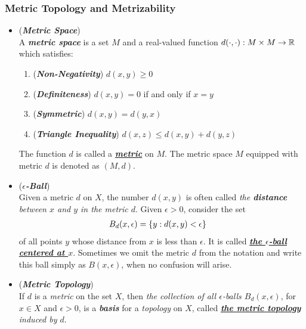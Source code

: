 \documentclass[11pt]{article}
\begin{document}
\subsubsection{Metric Topology and Metrizability}
\begin{itemize}
\item \begin{definition} (\emph{\textbf{Metric Space}})\\
A \emph{\textbf{metric space}} is a set $M$ and a real-valued function $d(\cdot , \cdot): M \times M \rightarrow {\mathbb R}$  which satisfies:
\begin{enumerate}
\item (\emph{\textbf{Non-Negativity}}) $d(x, y) \ge 0$
\item (\emph{\textbf{Definiteness}}) $d(x, y) = 0$ if and only if $x = y$
\item (\emph{\textbf{Symmetric}}) $d(x, y) = d(y, x)$
\item (\emph{\textbf{Triangle Inequality}}) $d(x, z) \le d(x, y) + d(y, z)$
\end{enumerate} The function $d$ is called a \underline{\emph{\textbf{metric}}} on $M$. The metric space $M$ equipped with metric $d$ is denoted as $(M, d)$.
\end{definition}

\item \begin{definition} (\emph{\textbf{$\epsilon$-Ball}})\\
Given a metric $d$ on $X$, the number $d(x, y)$ is often called \emph{the \textbf{distance} between $x$ and $y$ in the metric $d$}. Given $\epsilon > 0$, consider the set
\begin{align*}
B_{d}(x, \epsilon) &= \left\{y: d(x,y) < \epsilon\right\}
\end{align*}
of all points $y$ whose distance from $x$ is less than $\epsilon$. It is called \underline{\emph{\textbf{the $\epsilon$-ball centered at $x$}}}. Sometimes we omit the metric $d$ from the notation and write this ball simply as $B(x, \epsilon)$, when no confusion will arise.
\end{definition}

\item \begin{definition} (\emph{\textbf{Metric Topology}})\\
If $d$ is a \emph{metric} on the set $X$, then \emph{the collection of all $\epsilon$-balls $B_{d}(x, \epsilon)$}, for $x \in X$ and $\epsilon > 0$, is a \emph{\textbf{basis}} for a \emph{topology} on $X$, called \emph{\underline{\textbf{the metric topology}} induced by $d$}.
\end{definition}


\end{itemize}
\end{document}
